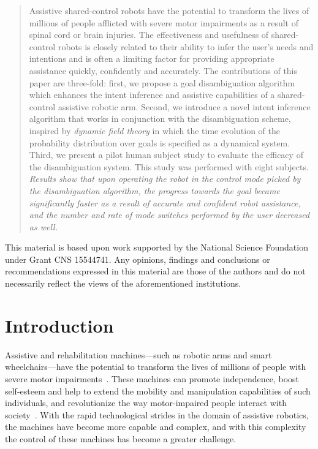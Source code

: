 \maketitle
\begin{abstract}
Assistive shared-control robots have the potential to transform the lives of millions of people afflicted with severe motor impairments as a result of spinal cord or brain injuries. The effectiveness and usefulness of shared-control robots is closely related to their ability to infer the user's needs and intentions and is often a limiting factor for providing appropriate assistance quickly, confidently and accurately. The contributions of this paper are three-fold: first, we propose a goal disambiguation algorithm which enhances the intent inference and assistive capabilities of a shared-control assistive robotic arm. Second, we introduce a novel intent inference algorithm that works in conjunction with the disambiguation scheme, inspired by \textit{dynamic field theory} in which the time evolution of the probability distribution over goals is specified as a dynamical system. Third, we present a pilot human subject study to evaluate the efficacy of the disambiguation system. This study was performed with eight subjects. \textit{Results show that upon operating the robot in the control mode picked by the disambiguation algorithm, the progress towards the goal became significantly faster as a result of accurate and confident robot assistance, and the number and rate of mode switches performed by the user decreased as well.} 
\end{abstract}
\begin{acknowledgements}
	This material is based upon work supported by the National Science Foundation under Grant CNS 15544741. Any opinions, findings and conclusions or
	recommendations expressed in this material are those of the authors and do
	not necessarily reflect the views of the aforementioned institutions.
\end{acknowledgements}
\section{Introduction}\label{sec:intro}

Assistive and rehabilitation machines---such as robotic arms and smart wheelchairs---have the potential to transform the lives of millions of people with severe motor impairments~\citep{laplante1992assistive}. These machines can promote independence, boost self-esteem and help to extend the mobility and manipulation capabilities of such individuals, and revolutionize the way motor-impaired people interact with society~\citep{scherer1996outcomes, huete2012personal}. With the rapid technological strides in the domain of assistive robotics, the machines have become more capable and complex, and with this complexity the control of these machines has become a greater challenge. 

